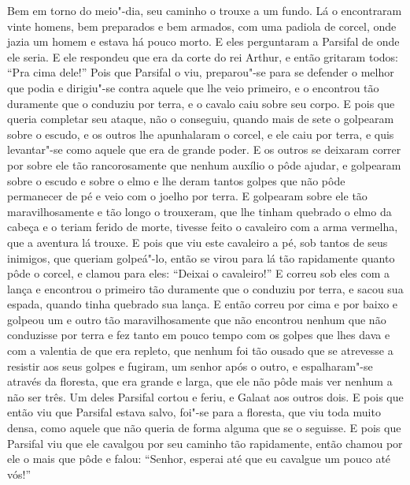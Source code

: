 Bem em torno do meio"-dia, seu caminho o trouxe a um fundo. Lá o encontraram
vinte homens, bem preparados e bem armados, com uma padiola de corcel, onde
jazia um homem e estava há pouco morto. E eles perguntaram a Parsifal de onde
ele seria. E ele respondeu que era da corte do rei Arthur, e então gritaram
todos: “Pra cima dele!” Pois que Parsifal o viu, preparou"-se para se defender
o melhor que podia e dirigiu"-se contra aquele que lhe veio primeiro, e o
encontrou tão duramente que o conduziu por terra, e o cavalo caiu sobre seu
corpo. E pois que queria completar seu ataque, não o conseguiu, quando mais de
sete o golpearam sobre o escudo, e os outros lhe apunhalaram o corcel, e ele
caiu por terra, e quis levantar"-se como aquele que era de grande poder. E os
outros se deixaram correr por sobre ele tão rancorosamente que nenhum auxílio o
pôde ajudar, e golpearam sobre o escudo e sobre o elmo e lhe deram tantos
golpes que não pôde permanecer de pé e veio com o joelho por terra. E golpearam
sobre ele tão maravilhosamente e tão longo o trouxeram, que lhe tinham quebrado
o elmo da cabeça e o teriam ferido de morte, tivesse feito o cavaleiro com a
arma vermelha, que a aventura lá trouxe. E pois que viu este cavaleiro a pé,
sob tantos de seus inimigos, que queriam golpeá"-lo, então se virou para lá tão
rapidamente quanto pôde o corcel, e clamou para eles: “Deixai o cavaleiro!” E
correu sob eles com a lança e encontrou o primeiro tão duramente que o conduziu
por terra, e sacou sua espada, quando tinha quebrado sua lança. E então correu
por cima e por baixo e golpeou um e outro tão maravilhosamente que não
encontrou nenhum que não conduzisse por terra e fez tanto em pouco tempo com
os golpes que lhes dava e com a valentia de que era repleto, que nenhum foi tão
ousado que se atrevesse a resistir aos seus golpes e fugiram, um senhor após o
outro, e espalharam"-se através da floresta, que era grande e larga, que ele não
pôde mais ver nenhum a não ser três. Um deles Parsifal cortou e feriu, e
Galaat aos outros dois. E pois que então viu que Parsifal estava salvo, foi"-se
para a floresta, que viu toda muito densa,  como aquele que não queria de forma
alguma que se o seguisse. E pois que Parsifal viu que ele cavalgou por seu
caminho tão rapidamente, então chamou por ele o mais que pôde e falou: “Senhor,
esperai até que eu cavalgue um pouco até vós!” 

